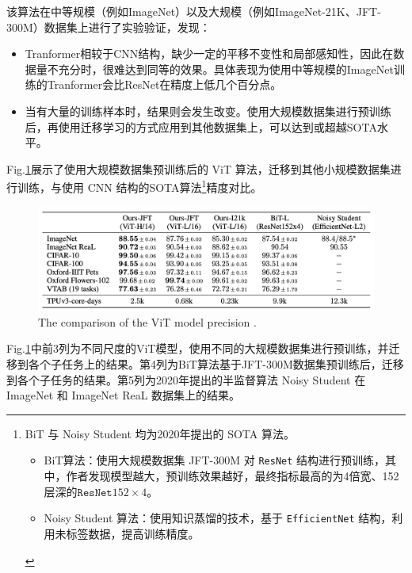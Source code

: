\documentclass[letterpaper,10pt]{article}
\begin{document}
	该算法在中等规模（例如ImageNet）以及大规模（例如ImageNet-21K、JFT-300M）数据集上进行了实验验证，发现：
	
	\begin{itemize}
		\item {}
			Tranformer相较于CNN结构，缺少一定的平移不变性和局部感知性，因此在数据量不充分时，很难达到同等的效果。具体表现为使用中等规模的ImageNet训练的Tranformer会比ResNet在精度上低几个百分点。
		\item {}
			当有大量的训练样本时，结果则会发生改变。使用大规模数据集进行预训练后，再使用迁移学习的方式应用到其他数据集上，可以达到或超越SOTA水平。
	\end{itemize}
	
	Fig.\ref{fig: ViT precision}展示了使用大规模数据集预训练后的 ViT 算法，迁移到其他小规模数据集进行训练，与使用 CNN 结构的SOTA算法\footnote{BiT 与 Noisy Student 均为2020年提出的 SOTA 算法。
		\begin{itemize}
			\item {}
				BiT算法\cite{kolesnikov2020big}：使用大规模数据集 JFT-300M 对 \texttt{ResNet} 结构进行预训练，其中，作者发现模型越大，预训练效果越好，最终指标最高的为4倍宽、152层深的$\texttt{ResNet}152\times 4$。
			\item {}
				Noisy Student 算法\cite{xie2020self}：使用知识蒸馏的技术，基于 \texttt{EfficientNet} 结构，利用未标签数据，提高训练精度。
		\end{itemize}	
	}精度对比。
	
	
	\begin{figure}[htbp]
		\centering 
		\includegraphics[width=0.8\columnwidth]{picture/The ViT model precision}
		\caption{
			\label{fig: ViT precision} The comparison of the ViT model precision .
		}
	\end{figure}
	
	
	Fig.\ref{fig: ViT precision}中前3列为不同尺度的ViT模型，使用不同的大规模数据集进行预训练，并迁移到各个子任务上的结果。第4列为BiT算法基于JFT-300M数据集预训练后，迁移到各个子任务的结果。第5列为2020年提出的半监督算法 Noisy Student 在 ImageNet 和 ImageNet ReaL 数据集上的结果。
	
\end{document}
